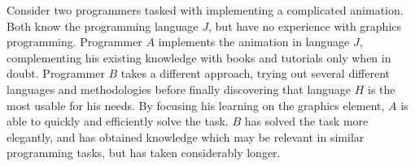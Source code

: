 \documentclass[\master/Master.tex]{subfiles}
\begin{document}
\begin{example}
    Consider two programmers tasked with implementing a complicated animation. Both know the programming language $J$, but have no experience with graphics programming. Programmer $A$ implements the animation in language $J$, complementing his existing knowledge with books and tutorials only when in doubt. Programmer $B$ takes a different approach, trying out several different languages and methodologies before finally discovering that language $H$ is the most usable for his needs. By focusing his learning on the graphics element, $A$ is able to quickly and efficiently solve the task. $B$ has solved the task more elegantly, and has obtained knowledge which may be relevant in similar programming tasks, but has taken considerably longer.
\end{example}

% 	
%
% 		
% 		
% 		
% 		
	
\end{document}
